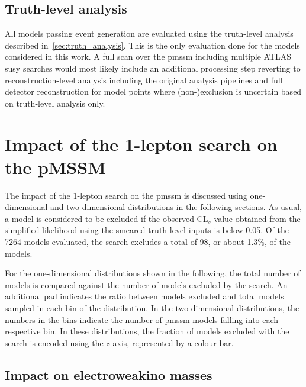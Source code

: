 \subsection{Truth-level analysis}

All models passing event generation are evaluated using the truth-level analysis described in~\cref{sec:truth_analysis}. This is the only evaluation done for the models considered in this work. A full scan over the \gls{pmssm} including multiple ATLAS \gls{susy} searches would most likely include an additional processing step reverting to reconstruction-level analysis including the original analysis pipelines and full detector reconstruction for model points where (non-)exclusion is uncertain based on truth-level analysis only.

\section{Impact of the 1-lepton search on the pMSSM}

The impact of the 1-lepton search on the \gls{pmssm} is discussed using one-dimensional and two-dimensional distributions in the following sections. As usual, a model is considered to be excluded if the observed CL$_s$ value obtained from the simplified likelihood using the smeared truth-level inputs is below 0.05. Of the 7264 models evaluated, the \onelepton search excludes a total of 98, or about 1.3\%, of the models.

For the one-dimensional distributions shown in the following, the total number of models is compared against the number of models excluded by the \onelepton search. An additional pad indicates the ratio between models excluded and total models sampled in each bin of the distribution. In the two-dimensional distributions, the numbers in the bins indicate the number of \gls{pmssm} models falling into each respective bin. In these distributions, the fraction of models excluded with the \onelepton search is encoded using the $z$-axis, represented by a colour bar.

\subsection{Impact on electroweakino masses}


